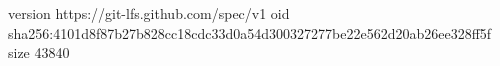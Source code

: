 version https://git-lfs.github.com/spec/v1
oid sha256:4101d8f87b27b828cc18cdc33d0a54d300327277be22e562d20ab26ee328ff5f
size 43840
